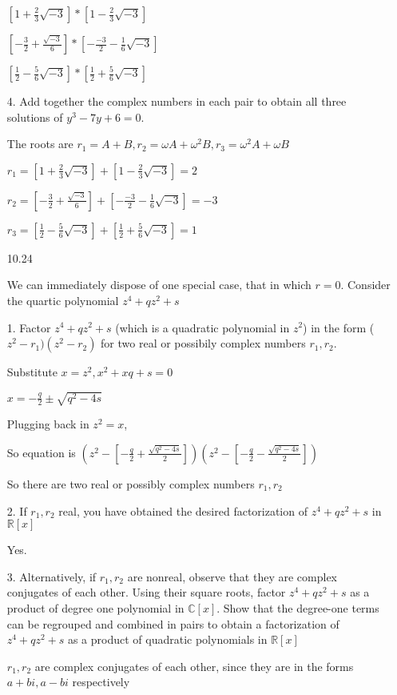 \documentclass[12pt]{article}
\begin{document}
\begin{itemize}
$[1 + \frac{2}{3}\sqrt{-3}]*[1 - \frac{2}{3}\sqrt{-3}]$

$[-\frac{3}{2} + \frac{\sqrt{-3}}{6}]*[-\frac{-3}{2} - \frac{1}{6}\sqrt{-3}]$

$[\frac{1}{2} - \frac{5}{6}\sqrt{-3}]*[\frac{1}{2} + \frac{5}{6}\sqrt{-3}]$

4. Add together the complex numbers in each pair to obtain all three solutions of $y^3 - 7y + 6 = 0$.

The roots are $r_1 = A + B, r_2 = \omega A + \omega ^2 B, r_3 = \omega ^2 A + \omega B$

$r_1 = [1 + \frac{2}{3}\sqrt{-3}] + [1 - \frac{2}{3}\sqrt{-3}] = 2$

$r_2 = [-\frac{3}{2} + \frac{\sqrt{-3}}{6}] + [-\frac{-3}{2} - \frac{1}{6}\sqrt{-3}] = -3$ 

$r_3 = [\frac{1}{2} - \frac{5}{6}\sqrt{-3}] + [\frac{1}{2} + \frac{5}{6}\sqrt{-3}] = 1$

\newpage

\item[10.24]

	We can immediately dispose of one special case, that in which $r = 0$. Consider the quartic polynomial $z^4 + qz^2 + s$

	1. Factor $z^4 + qz^2 + s$ (which is a quadratic polynomial in $z^2$) in the form ($z^2 - r_1)(z^2 - r_2)$ for two real or possibily complex numbers $r_1, r_2$.

	Substitute $x = z^2, x^2 + xq + s = 0$

	$x = -\frac{q}{2} \pm \sqrt{q^2 - 4s}$

	Plugging back in $z^2 = x$,

	So equation is $(z^2 -[-\frac{q}{2} + \frac{\sqrt{q^2 - 4s}}{2}])(z^2 -[-\frac{q}{2} - \frac{\sqrt{q^2 - 4s}}{2}])$

	So there are two real or possibly complex numbers $r_1, r_2$

	2. If $r_1, r_2$ real, you have obtained the desired factorization of $z^4 + qz^2 + s$ in $\mathbb{R}[x]$

	Yes.

	3. Alternatively, if $r_1, r_2$ are nonreal, observe that they are complex conjugates of each other. Using their square roots, factor $z^4 + qz^2 + s$ as a product of degree one polynomial in $\mathbb{C}[x]$. Show that the degree-one terms can be regrouped and combined in pairs to obtain a factorization of $z^4 + qz^2 + s$ as a product of quadratic polynomials in $\mathbb{R}[x]$

	$r_1, r_2$ are complex conjugates of each other, since they are in the forms $a + bi, a - bi$ respectively


\end{itemize}
\end{document}
